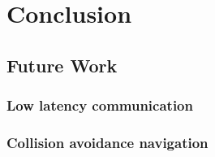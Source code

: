 
\chapter{Conclusion}

\section{Future Work}

\subsection{Low latency communication}

\subsection{Collision avoidance navigation}